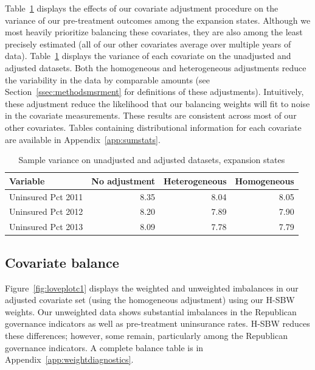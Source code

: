\documentclass[aoas]{imsart}
\theoremstyle{plain}
\theoremstyle{remark}
\begin{document}
Table~\ref{tab:adjust1} displays the effects of our covariate adjustment procedure on the variance of our pre-treatment outcomes among the expansion states. Although we most heavily prioritize balancing these covariates, they are also among the least precisely estimated (all of our other covariates average over multiple years of data). Table~\ref{tab:adjust1} displays the variance of each covariate on the unadjusted and adjusted datasets. Both the homogeneous and heterogeneous adjustments reduce the variability in the data by comparable amounts (see Section~\ref{ssec:methodsmsrment} for definitions of these adjustments). Intuitively, these adjustment reduce the likelihood that our balancing weights will fit to noise in the covariate measurements. These results are consistent across most of our other covariates. Tables containing distributional information for each covariate are available in Appendix~\ref{app:sumstats}. 

\begin{table}[ht]
\caption{Sample variance on unadjusted and adjusted datasets, expansion states}\label{tab:adjust1}
\begin{tabular}{lrrr}
  \hline
Variable & No adjustment & Heterogeneous & Homogeneous \\ 
  \hline
Uninsured Pct 2011 & 8.35 & 8.04 & 8.05 \\ 
  Uninsured Pct 2012 & 8.20 & 7.89 & 7.90 \\ 
  Uninsured Pct 2013 & 8.09 & 7.78 & 7.79 \\ 
   \hline
\end{tabular}
\end{table}

\subsection{Covariate balance}

Figure~\ref{fig:loveplotc1} displays the weighted and unweighted imbalances in our adjusted covariate set (using the homogeneous adjustment) using our H-SBW weights. Our unweighted data shows substantial imbalances in the Republican governance indicators as well as pre-treatment uninsurance rates. H-SBW reduces these differences; however, some remain, particularly among the Republican governance indicators. A complete balance table is in Appendix~\ref{app:weightdiagnostics}. 
\end{document}
